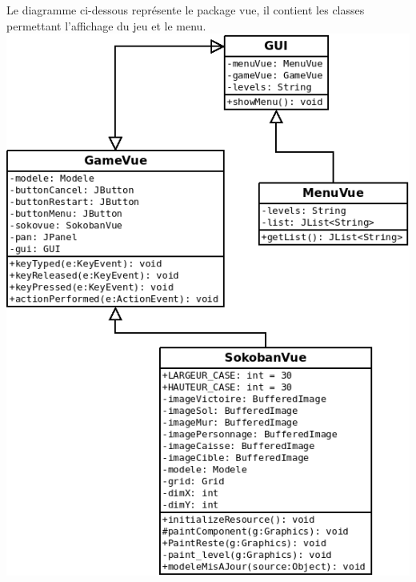 \documentclass[a4paper,12pt]{article} %
\begin{document}
Le diagramme ci-dessous représente le package vue, il contient les classes permettant l'affichage du jeu et le menu.\\
\includegraphics[scale=0.5]{Diagramme4.png}\\
\end{document}
